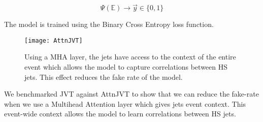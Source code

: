 \begin{equation}
\Psi(\mathbb{E}) \rightarrow \vec{y} \in \{0,1\}
\end{equation}

The model is trained using the Binary Cross Entropy loss function.

\begin{figure}[h!]
\centering
\texttt{[image: AttnJVT]}
\caption{Using a MHA layer, the jets have access to the context of the entire event which allows the model to capture correlations between HS jets. This effect reduces the fake rate of the model.}
\label{fig:test}
\end{figure}

We benchmarked JVT against AttnJVT to show that we can reduce the fake-rate when we use a Multihead Attention layer which gives jets event context. This event-wide context allows the model to learn correlations between HS jets.